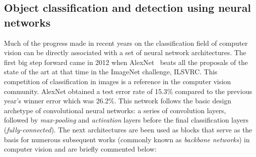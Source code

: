 \subsection{Object classification and detection using neural networks}
Much of the progress made in recent years on the classification field of computer vision can be directly associated with a set of neural network architectures. The first big step forward came in 2012 when AlexNet~\cite{krizhevsky2012imagenet} beats all the proposals of the state of the art at that time in the ImageNet challenge, ILSVRC. This competition of classification in images is a reference in the computer vision community. AlexNet obtained a test error rate of 15.3\% compared to the previous year's winner error which was 26.2\%. This network follows the basic design archetype of convolutional neural networks: a series of convolution layers, followed by \textit{max-pooling} and \textit{activation} layers before the final classification layers (\textit{fully-connected}). 
The next architectures are been used as blocks that serve as the basis for numerous subsequent works (commonly known as \textit{backbone networks}) in computer vision and are briefly commented below:
